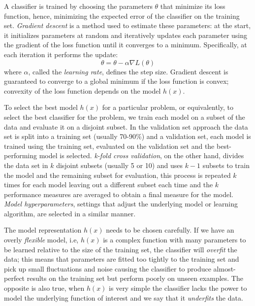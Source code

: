 A classifier is trained by choosing the parameters $\theta$ that minimize its loss function, hence, minimizing the expected error of the classifier on the training set. \emph{Gradient descent} is a method used to estimate these parameters: at the start, it initializes parameters at random and iteratively updates each parameter using the gradient of the loss function until it converges to a minimum. Specifically, at each iteration it performs the update:
\begin{equation}
	\theta = \theta - \alpha \nabla{L(\theta)}
\end{equation}
where $\alpha$, called the \emph{learning rate}, defines the step size. Gradient descent is guaranteed to converge to a global minimum if the loss function is convex; convexity of the loss function depends on the model $h(x)$.

To select the best model $h(x)$ for a particular problem, or equivalently, to select the best classifier for the problem, we train each model on a subset of the data and evaluate it on a disjoint subset. In the {validation set approach} the data set is split into a training set (usually 70-90\%) and a validation set, each model is trained using the training set, evaluated on the validation set and the best-performing model is selected. \emph{k-fold cross validation}, on the other hand, divides the data set in $k$ disjoint subsets (usually 5 or 10) and uses $k-1$ subsets to train the model and the remaining subset for evaluation, this process is repeated $k$ times for each model leaving out a different subset each time and the $k$ performance measures are averaged to obtain a final measure for the model.
\emph{Model hyperparameters}, settings that adjust the underlying model or learning algorithm, are selected in a similar manner.

The model representation $h(x)$ needs to be chosen carefully. If we have an overly \emph{flexible} model, i.e, $h(x)$ is a complex function with many parameters to be learned relative to the size of the training set, the classifier will \emph{overfit} the data; this means that parameters are fitted too tightly to the training set and pick up small fluctuations and noise causing the classifier to produce almost-perfect results on the training set but perform poorly on unseen examples. The opposite is also true, when $h(x)$ is very simple the classifier lacks the power to model the underlying function of interest and we say that it \emph{underfits} the data.%

